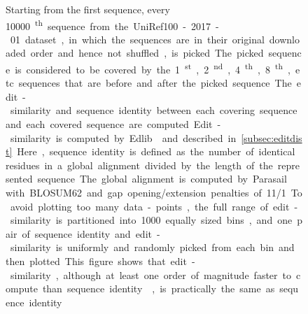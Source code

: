 \documentclass{bioinfo}
\begin{document}
\begin{figure}
	\centering
	\caption{
		Starting from the first sequence, every \SI{10000}\textsuperscript{th} sequence from the UniRef100-2017-01 dataset, in which the sequences are in their original downloaded order and hence not shuffled, is picked. The picked sequence is considered to be covered by the 1\textsuperscript{st}, 2\textsuperscript{nd}, 4\textsuperscript{th}, 8\textsuperscript{th}, etc. sequences that are before and after the picked sequence. The edit-similarity and sequence identity between each covering sequence and each covered sequence are computed. Edit-similarity is computed by Edlib \citep{vsovsic2017edlib} and described in \cref{subsec:editdist}. Here, sequence identity is defined as the  number of identical residues in a global alignment divided by the length of the represented sequence. 
		The global alignment is computed by Parasail \citep{daily2016parasail} with BLOSUM62 and gap opening/extension penalties of 11/1.
		To avoid plotting too many data-points, the full range of edit-similarity is partitioned into \SI{1000} equally sized bins, and one pair of sequence identity and edit-similarity is uniformly and randomly picked from each bin and then plotted.
		This figure shows that edit-similarity, although at least one order of magnitude faster to compute than sequence identity \citep{vsovsic2017edlib}, is practically the same as sequence identity.
		\label{fig:edsim-v-seqsim}
	}
\end{figure}
\end{document}
